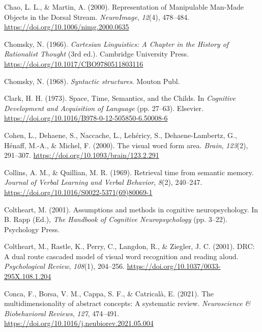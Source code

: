 \documentclass[
  a4paper,12pt,twoside,onecolumn,openright,final,oldfontcommands]{memoir}
\newlength{\cslhangindent}
\newlength{\cslentryspacingunit} %
\newenvironment{CSLReferences}[2] %
 {%
  \setlength{\parindent}{0pt}
  \ifodd #1
  \let\oldpar\par
  \def\par{\hangindent=\cslhangindent\oldpar}
  \fi
  \setlength{\parskip}{#2\cslentryspacingunit}
 }%
 {}
\begin{document}
\begin{CSLReferences}{1}{0}
\leavevmode{}%
Chao, L. L., \& Martin, A. (2000). Representation of {Manipulable} {Man}-{Made} {Objects} in the {Dorsal} {Stream}. \emph{NeuroImage}, \emph{12}(4), 478--484. \url{https://doi.org/10.1006/nimg.2000.0635}

\leavevmode{}%
Chomsky, N. (1966). \emph{Cartesian {Linguistics}: {A} {Chapter} in the {History} of {Rationalist} {Thought}} (3rd ed.). Cambridge University Press. \url{https://doi.org/10.1017/CBO9780511803116}

\leavevmode{}%
Chomsky, N. (1968). \emph{Syntactic structures}. Mouton Publ.

\leavevmode{}%
Clark, H. H. (1973). Space, {Time}, {Semantics}, and the {Childs}. In \emph{Cognitive {Development} and {Acquisition} of {Language}} (pp. 27--63). Elsevier. \url{https://doi.org/10.1016/B978-0-12-505850-6.50008-6}

\leavevmode{}%
Cohen, L., Dehaene, S., Naccache, L., Lehéricy, S., Dehaene-Lambertz, G., Hénaff, M.-A., \& Michel, F. (2000). The visual word form area. \emph{Brain}, \emph{123}(2), 291--307. \url{https://doi.org/10.1093/brain/123.2.291}

\leavevmode{}%
Collins, A. M., \& Quillian, M. R. (1969). Retrieval time from semantic memory. \emph{Journal of Verbal Learning and Verbal Behavior}, \emph{8}(2), 240--247. \url{https://doi.org/10.1016/S0022-5371(69)80069-1}

\leavevmode{}%
Coltheart, M. (2001). Assumptions and methods in cognitive neuropsychology. In B. Rapp (Ed.), \emph{The {Handbook} of {Cognitive} {Neuropsychology}} (pp. 3--22). Psychology Press.

\leavevmode{}%
Coltheart, M., Rastle, K., Perry, C., Langdon, R., \& Ziegler, J. C. (2001). {DRC}: {A} dual route cascaded model of visual word recognition and reading aloud. \emph{Psychological Review}, \emph{108}(1), 204--256. \url{https://doi.org/10.1037/0033-295X.108.1.204}

\leavevmode{}%
Conca, F., Borsa, V. M., Cappa, S. F., \& Catricalà, E. (2021). The multidimensionality of abstract concepts: {A} systematic review. \emph{Neuroscience \& Biobehavioral Reviews}, \emph{127}, 474--491. \url{https://doi.org/10.1016/j.neubiorev.2021.05.004}


\end{CSLReferences}
\end{document}
